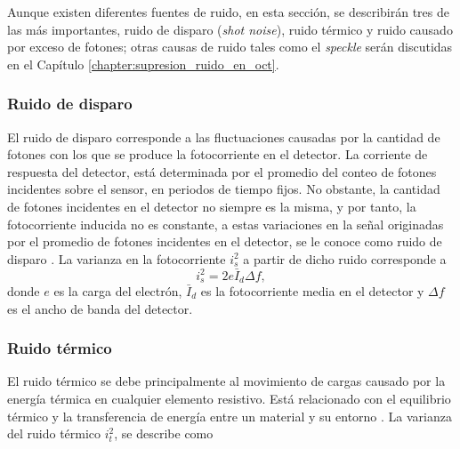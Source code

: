 Aunque existen diferentes fuentes de ruido, en esta sección, se describirán tres de las más importantes, ruido de disparo (\textit{shot noise}), ruido térmico y ruido causado por exceso de fotones; otras causas de ruido tales como el \textit{speckle} serán discutidas en el Capítulo \ref{chapter:supresion_ruido_en_oct}.

\subsubsection{Ruido de disparo}


El ruido de disparo corresponde a las fluctuaciones causadas por la cantidad de fotones con los que se produce la fotocorriente en el detector. La corriente de respuesta del detector, está determinada por el promedio del conteo de fotones incidentes sobre el sensor, en periodos de tiempo fijos. No obstante, la cantidad de fotones incidentes en el detector no siempre es la misma, y por tanto, la fotocorriente inducida no es constante, a estas variaciones en la señal originadas por el promedio de fotones incidentes en el detector, se le conoce como ruido de disparo \cite{Tomlins}. La varianza en la fotocorriente $i_s^2$ a partir de dicho ruido corresponde a \cite{Rollins1999_2}
\begin{equation}
	i_s^2=2 e \bar{I}_d \Delta f,
\end{equation}
donde $e$ es la carga del electrón, $\bar{I}_d$ es la fotocorriente media en el detector y $\Delta f$ es el ancho de banda del detector.

\subsubsection{Ruido térmico}

El ruido térmico se debe principalmente al movimiento de cargas causado por la energía térmica en cualquier elemento resistivo. Está relacionado con el equilibrio térmico y la transferencia de energía entre un material y su entorno \cite{Bouma2002}. La varianza del ruido térmico $i_t^2$, se describe como

